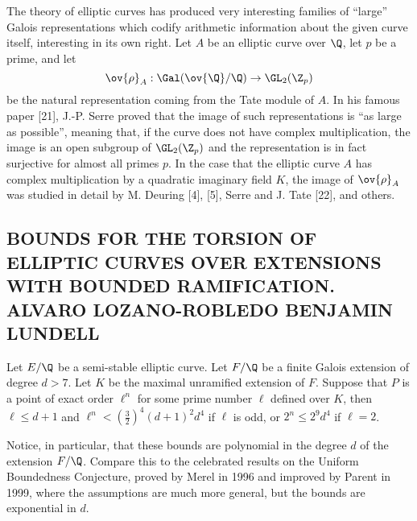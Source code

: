 The theory of elliptic curves has produced very interesting families of ``large'' Galois representations which codify arithmetic information about the given curve itself, interesting in its own right. Let $A$ be an elliptic curve over $\Q$, let $p$ be a prime, and let
	\[
	\ov{\rho}_A: \Gal(\ov{\Q}/\Q) \to \GL_2(\Z_p)
	\]
be the natural representation coming from the Tate module of $A$. In his famous paper [21], J.-P. Serre proved that the image of such representations is ``as large as possible'', meaning that, if the curve does not have complex multiplication, the image is an open subgroup of $\GL_2(\Z_p)$ and the representation is in fact surjective for almost all primes $p$.  In the case that the elliptic curve $A$ has complex multiplication by a quadratic imaginary field $K$, the image of $\ov{\rho}_A$ was studied in detail by M. Deuring [4], [5], Serre and J. Tate [22], and others.



\subsection{BOUNDS FOR THE TORSION OF ELLIPTIC CURVES OVER EXTENSIONS WITH BOUNDED RAMIFICATION. ALVARO LOZANO-ROBLEDO BENJAMIN LUNDELL}


\begin{thm}[2]
Let $E/\Q$ be a semi-stable elliptic curve. Let $F/\Q$ be a finite Galois extension of degree $d > 7$. Let $K$ be the maximal unramified extension of $F$. Suppose that $P$ is a point of exact order $\ell^n$ for some prime number $\ell$ defined over $K$, then $\ell \leq d + 1$ and $\ell^n < \left(\frac{3}{2}\right)^4 (d+1)^2 d^4$ if $\ell$ is odd, or $2^n \leq 2^9 d^4$ if $\ell= 2$.
\end{thm}


Notice, in particular, that these bounds are polynomial in the degree $d$ of the
extension $F/\Q$. Compare this to the celebrated results on the Uniform Boundedness
Conjecture, proved by Merel in 1996 and improved by Parent in 1999, where the
assumptions are much more general, but the bounds are exponential in $d$.


